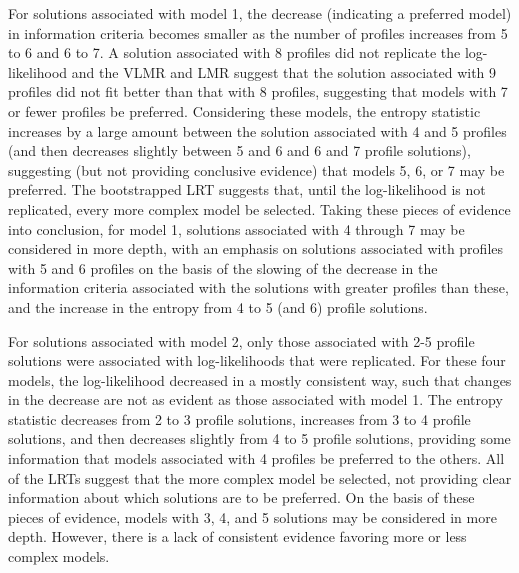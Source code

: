 \documentclass[]{book}
\theoremstyle{definition}
\theoremstyle{definition}
\theoremstyle{definition}
\theoremstyle{remark}
\begin{document}
For solutions associated with model 1, the decrease (indicating a
preferred model) in information criteria becomes smaller as the number
of profiles increases from 5 to 6 and 6 to 7. A solution associated with
8 profiles did not replicate the log-likelihood and the VLMR and LMR
suggest that the solution associated with 9 profiles did not fit better
than that with 8 profiles, suggesting that models with 7 or fewer
profiles be preferred. Considering these models, the entropy statistic
increases by a large amount between the solution associated with 4 and 5
profiles (and then decreases slightly between 5 and 6 and 6 and 7
profile solutions), suggesting (but not providing conclusive evidence)
that models 5, 6, or 7 may be preferred. The bootstrapped LRT suggests
that, until the log-likelihood is not replicated, every more complex
model be selected. Taking these pieces of evidence into conclusion, for
model 1, solutions associated with 4 through 7 may be considered in more
depth, with an emphasis on solutions associated with profiles with 5 and
6 profiles on the basis of the slowing of the decrease in the
information criteria associated with the solutions with greater profiles
than these, and the increase in the entropy from 4 to 5 (and 6) profile
solutions.

For solutions associated with model 2, only those associated with 2-5
profile solutions were associated with log-likelihoods that were
replicated. For these four models, the log-likelihood decreased in a
mostly consistent way, such that changes in the decrease are not as
evident as those associated with model 1. The entropy statistic
decreases from 2 to 3 profile solutions, increases from 3 to 4 profile
solutions, and then decreases slightly from 4 to 5 profile solutions,
providing some information that models associated with 4 profiles be
preferred to the others. All of the LRTs suggest that the more complex
model be selected, not providing clear information about which solutions
are to be preferred. On the basis of these pieces of evidence, models
with 3, 4, and 5 solutions may be considered in more depth. However,
there is a lack of consistent evidence favoring more or less complex
models.
\end{document}
